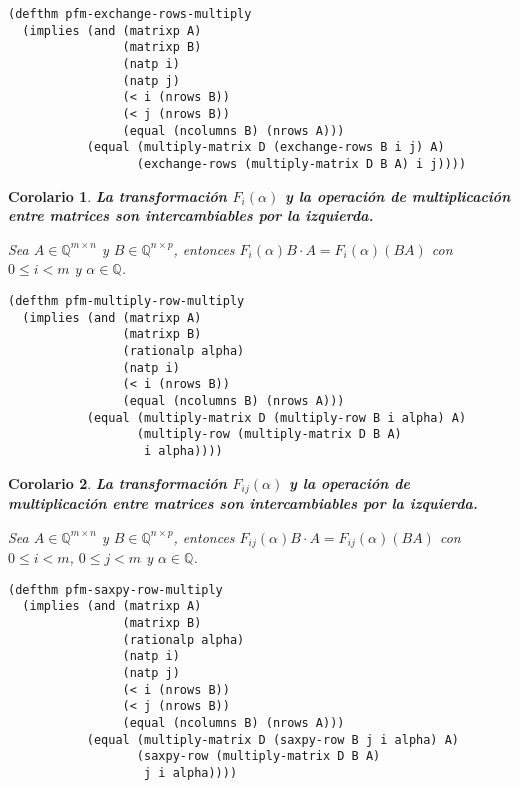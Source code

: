 \documentclass[a4paper,10pt]{article}
\newcommand{\Q}[1]{#1 \in \mathbb{Q}}
\newcommand{\M}[3]{#1 \in \mathbb{Q}^{#2 \times #3}}
\newtheorem{coro}{{Corolario}}
\begin{document}
\begin{lstlisting}[language=clips]
(defthm pfm-exchange-rows-multiply
  (implies (and (matrixp A)
                (matrixp B)
                (natp i)
                (natp j)
                (< i (nrows B))
                (< j (nrows B))
                (equal (ncolumns B) (nrows A)))
           (equal (multiply-matrix D (exchange-rows B i j) A)
                  (exchange-rows (multiply-matrix D B A) i j))))  
\end{lstlisting}

\par \vspace{16pt}

\begin{coro} \textbf{La transformación $F_{i}(\alpha)$ y la operación de multiplicación entre matrices son intercambiables por la izquierda.}\vspace{8pt}\par
Sea $\M{A}{m}{n}$ y $\M{B}{n}{p}$, entonces $F_{i}(\alpha)B\cdot A = F_{i}(\alpha)(BA)$ con $0 \leq i < m$ y $\Q{\alpha}$.
\end{coro}

\begin{lstlisting}[language=clips]
(defthm pfm-multiply-row-multiply
  (implies (and (matrixp A)
                (matrixp B)
                (rationalp alpha)
                (natp i)
                (< i (nrows B))
                (equal (ncolumns B) (nrows A)))
           (equal (multiply-matrix D (multiply-row B i alpha) A)
                  (multiply-row (multiply-matrix D B A) 
                   i alpha))))
\end{lstlisting}

\par \vspace{16pt}

\begin{coro} \textbf{La transformación $F_{ij}(\alpha)$ y la operación de multiplicación entre matrices son intercambiables por la izquierda.}\vspace{8pt}\par
Sea $\M{A}{m}{n}$ y $\M{B}{n}{p}$, entonces $F_{ij}(\alpha)B\cdot A = F_{ij}(\alpha)(BA)$ con $0 \leq i < m$, $0 \leq j < m$ y $\Q{\alpha}$.
\end{coro}

\begin{lstlisting}[language=clips]
(defthm pfm-saxpy-row-multiply
  (implies (and (matrixp A)
                (matrixp B)
                (rationalp alpha)
                (natp i)
                (natp j)
                (< i (nrows B))
                (< j (nrows B))
                (equal (ncolumns B) (nrows A)))
           (equal (multiply-matrix D (saxpy-row B j i alpha) A)
                  (saxpy-row (multiply-matrix D B A) 
                   j i alpha))))
\end{lstlisting}
\end{document}

